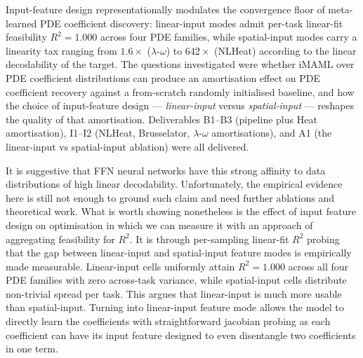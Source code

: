 \documentclass[10pt,journal,compsoc]{IEEEtran}
\begin{document}
Input-feature design representationally modulates the convergence floor of
meta-learned PDE coefficient discovery: linear-input modes admit
per-task linear-fit feasibility $R^2 = 1.000$ across four PDE
families, while spatial-input modes carry a linearity tax ranging
from $1.6\times$ ($\lambda$-$\omega$) to $642\times$ (NLHeat) according
to the linear decodability of the target. The questions
investigated were whether iMAML over PDE coefficient distributions
can produce an amortisation effect on PDE coefficient recovery
against a from-scratch randomly initialised baseline, and how the
choice of input-feature design --- \emph{linear-input} versus
\emph{spatial-input} --- reshapes the quality of that amortisation.
Deliverables B1--B3 (pipeline plus Heat amortisation), I1--I2
(NLHeat, Brusselator, $\lambda$-$\omega$ amortisations), and A1 (the
linear-input vs spatial-input ablation) were all delivered.

It is suggestive that FFN neural networks have this strong affinity to data
distributions of high linear decodability. Unfortunately, the empirical
evidence here is still not enough to ground such claim and need further
ablations and theoretical work. What is worth showing nonetheless is the effect
of input feature design on optimisation in which we can measure it with an
approach of aggregating feasibility for $R^2$. It is through per-sampling
linear-fit $R^2$ probing that the gap between linear-input and spatial-input
feature modes is empirically made measurable. Linear-input cells uniformly
attain $R^2 = 1.000$ across all four PDE families with zero across-task
variance, while spatial-input cells distribute non-trivial spread per task.
This argues that linear-input is much more usable than spatial-input. Turning
into linear-input feature mode allows the model to directly learn the
coefficients with straightforward jacobian probing as each coefficient can have
its input feature designed to even disentangle two coefficients in one term.
\end{document}
